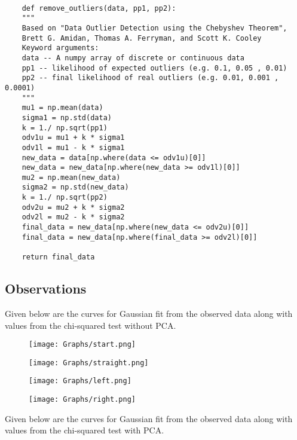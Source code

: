 \documentclass[10pt,a4paper]{article}
\begin{document}
\begin{tcolorbox}
\begin{verbatim}

	def remove_outliers(data, pp1, pp2):
	"""
	Based on "Data Outlier Detection using the Chebyshev Theorem",
	Brett G. Amidan, Thomas A. Ferryman, and Scott K. Cooley
	Keyword arguments:
	data -- A numpy array of discrete or continuous data
	pp1 -- likelihood of expected outliers (e.g. 0.1, 0.05 , 0.01)
	pp2 -- final likelihood of real outliers (e.g. 0.01, 0.001 , 0.0001)
	"""
	mu1 = np.mean(data)
	sigma1 = np.std(data)
	k = 1./ np.sqrt(pp1)
	odv1u = mu1 + k * sigma1
	odv1l = mu1 - k * sigma1
	new_data = data[np.where(data <= odv1u)[0]]
	new_data = new_data[np.where(new_data >= odv1l)[0]]
	mu2 = np.mean(new_data)
	sigma2 = np.std(new_data)
	k = 1./ np.sqrt(pp2)
	odv2u = mu2 + k * sigma2
	odv2l = mu2 - k * sigma2
	final_data = new_data[np.where(new_data <= odv2u)[0]]
	final_data = new_data[np.where(final_data >= odv2l)[0]]
	
	return final_data
\end{verbatim}
\end{tcolorbox}
	
	
\newpage	
\subsection{Observations}
		
Given below are the curves for Gaussian fit from the observed data {\color{blue}along with values from the chi-squared test without PCA.}


\begin{figure}[H]
	\centering
	\texttt{[image: Graphs/start.png]}
\end{figure}

\begin{figure}[H]
	\centering
	\texttt{[image: Graphs/straight.png]}
\end{figure}

\begin{figure}[H]
	\centering
	\texttt{[image: Graphs/left.png]}
\end{figure}

\begin{figure}[H]
	\centering
	\texttt{[image: Graphs/right.png]}
\end{figure}

{\color{blue}Given below are the curves for Gaussian fit from the observed data along with values from the chi-squared test with PCA.}
\end{document}

